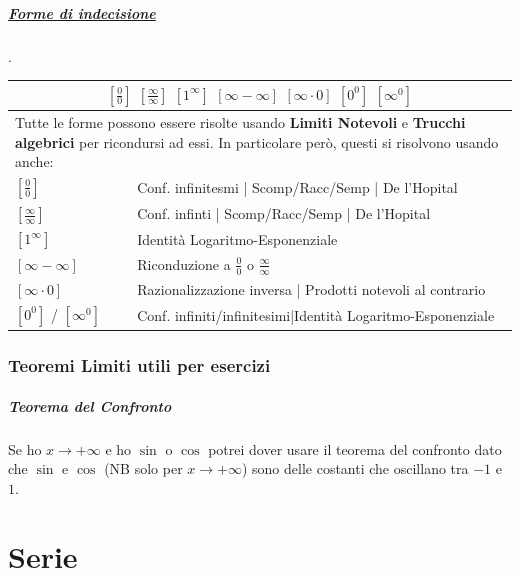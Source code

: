 \documentclass[12pt, a4paper, openany]{book}
\begin{document}
\paragraph*{\underline{Forme di indecisione}}.\\
\begin{tabularx}{\textwidth}{|l|X|}
	\hline
	\multicolumn{2}{|c|}{
		$[\frac{0}{0}]$ $[\frac{\infty}{\infty}]$ $[1^\infty]$ $[\infty - \infty]$ $[\infty \cdot 0]$ $[0^0]$ $[\infty^0]$
	}                                                                                       \\
	\hline
	\multicolumn{2}{|X|}{
		\small{Tutte le forme possono essere risolte usando \textbf{Limiti Notevoli} e \textbf{Trucchi algebrici} per ricondursi ad essi.
			In particolare però, questi si risolvono usando anche:}
	}                                                                                       \\
	\hline
	$[\frac{0}{0}]$           & Conf. infinitesmi | Scomp/Racc/Semp | De l'Hopital          \\
	\hline
	$[\frac{\infty}{\infty}]$ & Conf. infinti | Scomp/Racc/Semp | De l'Hopital              \\
	\hline
	$[1^\infty]$              & Identità Logaritmo-Esponenziale                             \\
	\hline
	$[\infty - \infty]$       & Riconduzione a $\frac{0}{0}$ o $\frac{\infty}{\infty}$      \\
	\hline
	$[\infty \cdot 0]$        & Razionalizzazione inversa | Prodotti notevoli al contrario  \\
	\hline
	$[0^0]$ / $[\infty^0]$    & Conf. infiniti/infinitesimi|Identità Logaritmo-Esponenziale \\
	\hline
\end{tabularx}

\subsection*{Teoremi Limiti utili per esercizi}
\paragraph*{Teorema del Confronto} Se ho $x \rightarrow +\infty$ e ho $\sin$ o  $\cos$ potrei dover usare
il teorema del confronto dato che $\sin$ e $\cos$ (NB solo per $x \rightarrow +\infty$)
sono delle costanti che oscillano tra $-1$ e $1$.



\chapter{Serie}
\end{document}
